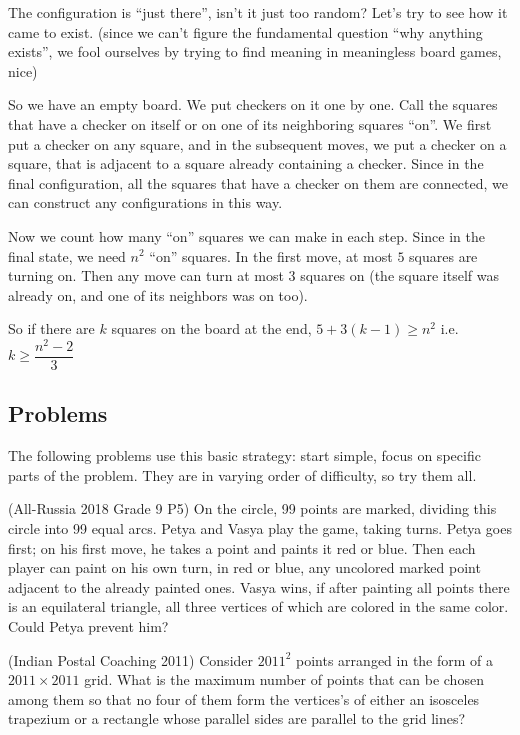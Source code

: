 \documentclass[12pt,a4paper]{article}
\begin{document}
		\begin{solution}
			The configuration is ``just there'', isn't it just too random? Let's try to see how it came to exist. (since we can't figure the fundamental question ``why anything exists'', we fool ourselves by trying to find meaning in meaningless board games, nice)
			
			So we have an empty board. We put checkers on it one by one. Call the squares that have a checker on itself or on one of its neighboring squares ``on''. We first put a checker on any square, and in the subsequent moves, we put a checker on a square, that is adjacent to a square already containing a checker. Since in the final configuration, all the squares that have a checker on them are connected, we can construct any configurations in this way.
			
			Now we count how many ``on'' squares we can make in each step. Since in the final state, we need $ n^2 $ ``on'' squares. In the first move, at most $ 5 $ squares are turning on. Then any move can turn at most $ 3 $ squares on (the square itself was already on, and one of its neighbors was on too).
			
			So if there are $ k $ squares on the board at the end, $ 5+3(k-1) \ge n^2 $ i.e. $ k\ge \dfrac{n^2-2}{3} $
		\end{solution}
		
		
		
		\subsection{Problems}
		
			The following problems use this basic strategy: start simple, focus on specific parts of the problem. They are in varying order of difficulty, so try them all.
		
			\begin{problem}(All-Russia 2018 Grade 9 P5)
				On the circle, 99 points are marked, dividing this circle into 99 equal arcs. Petya and Vasya play the game, taking turns. Petya goes first; on his first move, he takes a point and paints it red or blue. Then each player can paint on his own turn, in red or blue, any uncolored marked point adjacent to the already painted ones. Vasya wins, if after painting all points there is an equilateral triangle, all three vertices of which are colored in the same color. Could Petya prevent him?
			\end{problem}
		
			\begin{problem}(Indian Postal Coaching 2011)
				Consider $ 2011^2 $ points arranged in the form of a $ 2011 \times 2011 $ grid. What is the maximum number of points that can be chosen among them so that no four of them form the vertices's of either an isosceles trapezium or a rectangle whose parallel sides are parallel to the grid lines?
			\end{problem}
		
\end{document}
